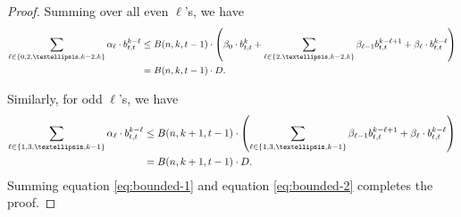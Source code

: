 \documentclass[10pt,a4paper]{amsart}
\begin{document}
\begin{proof}
    
    Summing over all even $\ell$'s, we have
    \begin{align}
        \sum_{\ell \in \{0, 2, \ldots, k-2, k\}} \alpha_{\ell} \cdot b_{t,t}^{k-\ell} &\leq B(n, k, t-1) \cdot \left(\beta_0 \cdot b_{t,t}^k + \sum_{\ell \in \{2, \ldots, k-2, k\}} \beta_{\ell-1} b_{t,t}^{k-\ell+1} +   \beta_{\ell} \cdot b_{t,t}^{k-\ell} \right) \notag\\
        &= B(n, k, t-1)  \cdot D. \label{eq:bounded-1}
    \end{align}

    Similarly, for odd $\ell$'s, we have
 \begin{align}
        \sum_{\ell \in \{1, 3, \ldots, k-1\}} \alpha_{\ell} \cdot b_{t,t}^{k-\ell} &\leq B(n, k+1, t-1) \cdot \left(\sum_{\ell \in \{1, 3, \ldots, k-1\}} \beta_{\ell-1} b_{t,t}^{k-\ell+1} +   \beta_{\ell} \cdot b_{t,t}^{k-\ell} \right) \notag\\
        &= B(n, k+1, t-1) \cdot D.\label{eq:bounded-2}
    \end{align}
    Summing equation \eqref{eq:bounded-1} and equation \eqref{eq:bounded-2} completes the proof.
\end{proof}
\end{document}
